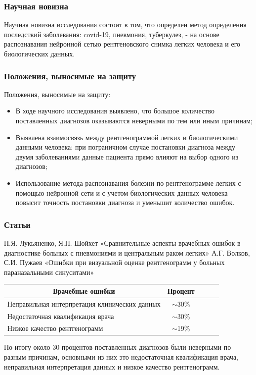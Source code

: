 \documentclass[
	fullscreen=true, 
	bookmarks=false,
	sans serif,
	9pt,
	pdf,
	hyperref={
		pdfpagelabels=false,
		unicode=true
	}
]{beamer}
\begin{document}
	\begin{frame}\frametitle{Научная новизна}
		Научная новизна исследования состоит в том, что определен метод определения последствий заболевания: covid-19, пневмония, туберкулез, - на основе распознавания нейронной сетью рентгеновского снимка легких человека и его биологических данных. 
	\end{frame}

	\begin{frame}\frametitle{Положения, выносимые на защиту}
		Положения, выносимые на защиту:
		\begin{itemize}
			\item В ходе научного исследования выявлено, что большое количество поставленных диагнозов оказываются неверными по тем или иным причинам;
			\item Выявлена взаимосвязь между рентгенограммой легких и биологическими данными человека: при пограничном случае постановки диагноза между двумя заболеваниями данные пациента прямо влияют на выбор одного из диагнозов;
			\item Использование метода распознавания болезни по рентгенограмме легких с помощью нейронной сети и с учетом биологических данных человека повысит точность постановки диагноза и уменьшит количество ошибок.
			\newline
		\end{itemize}
	\end{frame}

	\begin{frame}[fragile]\frametitle{Статьи}	
		Н.Я. Лукьяненко, Я.Н. Шойхет «Сравнительные аспекты врачебных ошибок в диагностике больных с пневмониями и центральным раком легких»
А.Г. Волков, С.И. Пужаев «Ошибки при визуальной оценке рентгенограмм у больных параназальными синуситами»

        \begin{table}[]
            \begin{tabular}{|l|c|l|l|l|}
                \hline
                \multicolumn{1}{|c|}{Врачебные ошибки}        & Процент   \\ \hline
                Неправильная интерпретация клинических данных & $\sim$30\%  \\ \hline
                Недостаточная квалификация врача              & $\sim$30\%  \\ \hline
                Низкое качество рентгенограмм                 & $\sim$19\%   \\ \hline
            \end{tabular}
        \end{table}
        
        По итогу около 30 процентов поставленных диагнозов были неверными по разным причинам, основными из них это недостаточная квалификация врача, неправильная интерпретация данных и низкое качество рентгенограмм.

	\end{frame}
	
\end{document}
